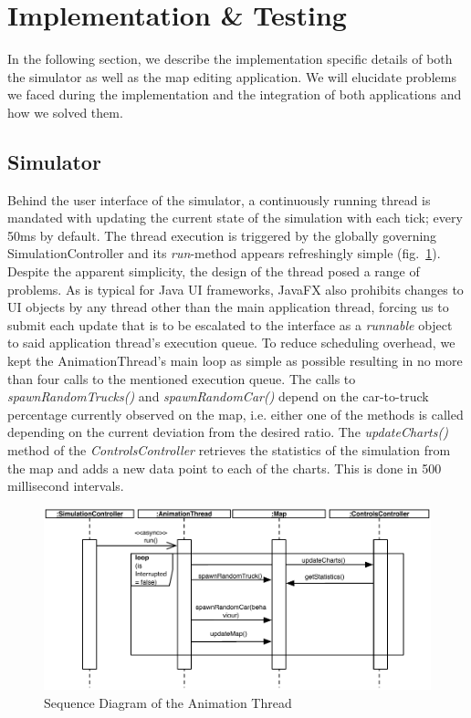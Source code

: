 \section{Implementation & Testing}
In the following section, we describe the implementation specific details of both the simulator as well as the map editing application. We will elucidate problems we faced during the implementation and the integration of both applications and how we solved them. 
\subsection{Simulator}
Behind the user interface of the simulator, a continuously running thread is mandated with updating the current state of the simulation with each tick; every 50ms by default. The thread execution is triggered by the globally governing SimulationController and its \textit{run}-method appears refreshingly simple (fig.~\ref{fig:animthread}). Despite the apparent simplicity, the design of the thread posed a range of problems. As is typical for Java UI frameworks, JavaFX also prohibits changes to UI objects by any thread other than the main application thread, forcing us to submit each update that is to be escalated to the interface as a \textit{runnable} object to said application thread's execution queue. To reduce scheduling overhead, we kept the AnimationThread's main loop as simple as possible resulting in no more than four calls to the mentioned execution queue. The calls to \textit{spawnRandomTrucks()} and \textit{spawnRandomCar()} depend on the car-to-truck percentage currently observed on the map, i.e. either one of the methods is called depending on the current deviation from the desired ratio. The \textit{updateCharts()} method of the \textit{ControlsController} retrieves the statistics of the simulation from the map and adds a new data point to each of the charts. This is done in 500 millisecond intervals.

\begin{figure}[h]
	\begin{center}
		\includegraphics[width=\textwidth]{img/SD_animThread.pdf}
		\caption[Sequence Diagram of the Animation Thread]{Sequence Diagram of the Animation Thread}
		\label{fig:animthread}
	\end{center}

\end{figure}

